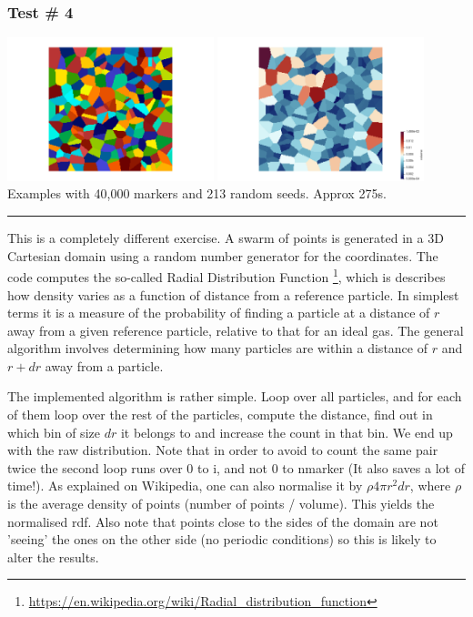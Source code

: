 \subsubsection*{Test \# 4}

\begin{center}
\includegraphics[width=6cm]{python_codes/fieldstone_125/results/test4a}
\includegraphics[width=6cm]{python_codes/fieldstone_125/results/test4b}\\
{\captionfont Examples with 40,000 markers and 213 random seeds. Approx 275s. }
\end{center}

\noindent\rule{\textwidth}{1pt}


This is a completely different exercise. A swarm of points is generated in a 3D Cartesian 
domain using a random number generator for the coordinates.
The code computes the so-called Radial Distribution Function
\footnote{\url{https://en.wikipedia.org/wiki/Radial_distribution_function}}, 
which is describes how density varies as a function of distance from a reference particle. 
In simplest terms it is a measure of the probability of finding a particle at a distance of $r$ 
away from a given reference particle, relative to that for an ideal gas. 
The general algorithm involves determining how many particles are within a distance of $r$ and $r+dr$ away from a particle. 

The implemented algorithm is rather simple. Loop over all particles, and for each of them 
loop over the rest of the particles, compute the distance, find out in which bin of size $dr$ it belongs 
to and increase the count in that bin. We end up with the raw distribution.
Note that in order to avoid to count the same pair twice the second loop 
runs over 0 to i, and not 0 to nmarker (It also saves a lot of time!).
As explained on Wikipedia, one can also normalise it by $\rho 4\pi r^2 dr$, where $\rho$ is
the average density of points (number of points / volume). This yields the 
normalised rdf. 
Also note that points close to the sides of the domain are not 'seeing' the ones 
on the other side (no periodic conditions) so this is likely to alter the results.

